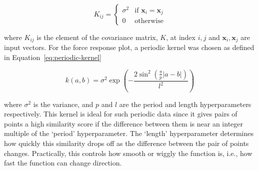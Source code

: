 \documentclass[12pt]{article}
\begin{document}
    \begin{equation}
        K_{ij} =
        \begin{cases}
            \sigma^2 & \text{if } \mathbf{x}_i = \mathbf{x}_j \\
            0 & \text{otherwise}
        \end{cases}\label{eq:white-noise-kernel}
    \end{equation}

    where $K_{ij}$ is the element of the covariance matrix, $K$, at index $i, j$ and $\mathbf{x}_i, \mathbf{x}_j$ are input vectors.
    For the force response plot, a periodic kernel was chosen as defined in Equation~\ref{eq:periodic-kernel}

    \begin{equation}
        k(a, b) = \sigma^2 \exp\left(- \frac{2 \sin^2\left(\frac{\pi}{p} |a - b|\right)}{l^2}\right)\label{eq:periodic-kernel}
    \end{equation}

    where $\sigma^2$ is the variance, and $p$ and $l$ are the period and length hyperparameters respectively.
    This kernel is ideal for such periodic data since it gives pairs of points a high similarity score if the difference between them is near an integer multiple of the `period' hyperparameter.
    The `length' hyperparameter determines how quickly this similarity drops off as the difference between the pair of points changes.
    Practically, this controls how smooth or wiggly the function is, i.e., how fast the function can change direction.
\end{document}
